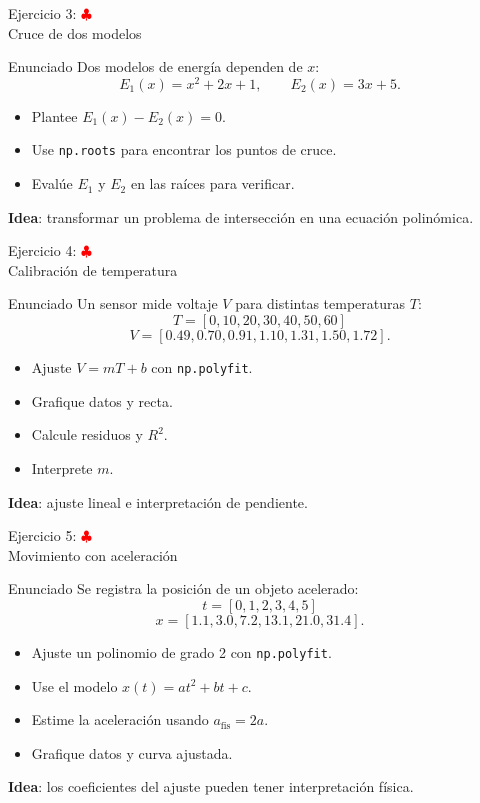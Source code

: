 \documentclass[10pt]{beamer}
\begin{document}
\begin{frame}{Ejercicio 3: \hfill \textcolor{red}{$\clubsuit$} \\ Cruce de dos modelos}
  \begin{block}{Enunciado}
    Dos modelos de energía dependen de \(x\):
    \[
      E_1(x)=x^2+2x+1,\qquad E_2(x)=3x+5.
    \]
    \begin{itemize}
      \item Plantee \(E_1(x)-E_2(x)=0\).
      \item Use \texttt{np.roots} para encontrar los puntos de cruce.
      \item Evalúe \(E_1\) y \(E_2\) en las raíces para verificar.
    \end{itemize}
  \end{block}

  \textbf{Idea}: transformar un problema de intersección en una ecuación polinómica.
\end{frame}

\begin{frame}{Ejercicio 4: \hfill \textcolor{red}{$\clubsuit$} \\ Calibración de temperatura}
  \begin{block}{Enunciado}
    Un sensor mide voltaje \(V\) para distintas temperaturas \(T\):
    \[
      T=[0,10,20,30,40,50,60]
    \]
    \[
      V=[0.49,0.70,0.91,1.10,1.31,1.50,1.72].
    \]
    \begin{itemize}
      \item Ajuste \(V=mT+b\) con \texttt{np.polyfit}.
      \item Grafique datos y recta.
      \item Calcule residuos y \(R^2\).
      \item Interprete \(m\).
    \end{itemize}
  \end{block}

  \textbf{Idea}: ajuste lineal e interpretación de pendiente.
\end{frame}

\begin{frame}{Ejercicio 5: \hfill \textcolor{red}{$\clubsuit$} \\ Movimiento con aceleración}
  \begin{block}{Enunciado}
    Se registra la posición de un objeto acelerado:
    \[
      t=[0,1,2,3,4,5]
    \]
    \[
      x=[1.1,3.0,7.2,13.1,21.0,31.4].
    \]
    \begin{itemize}
      \item Ajuste un polinomio de grado 2 con \texttt{np.polyfit}.
      \item Use el modelo \(x(t)=at^2+bt+c\).
      \item Estime la aceleración usando \(a_{\mathrm{fis}}=2a\).
      \item Grafique datos y curva ajustada.
    \end{itemize}
  \end{block}

  \textbf{Idea}: los coeficientes del ajuste pueden tener interpretación física.
\end{frame}
\end{document}

